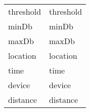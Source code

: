 \documentclass{article}
\begin{document}
\begin{table}[h]
    \centering
    \begin{tabular}{l l}
        threshold & {{threshold}} \\
        minDb     & {{minDb}}     \\
        maxDb     & {{maxDb}}     \\
        location  & {{location}}  \\
        time      & {{time}}      \\
        device    & {{device}}    \\
        distance  & {{distance}}  \\
    \end{tabular}
\end{table}
\end{document}
